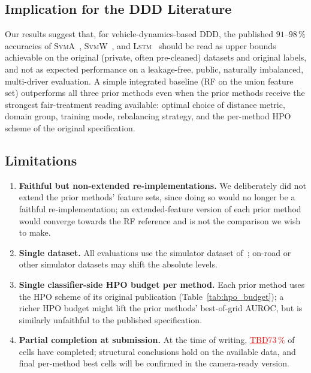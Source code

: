 \documentclass[lettersize,journal]{IEEEtran}
\newcommand{\Impl}[1]{\textsc{#1}}
\newcommand{\TBD}[1]{\textcolor{red}{\underline{TBD#1}}}
\begin{document}
\subsection{Implication for the DDD Literature}
Our results suggest that, for vehicle-dynamics-based DDD, the published $91$--$98\,\%$ accuracies of \Impl{SvmA}~\cite{arefnezhad2019}, \Impl{SvmW}~\cite{zhao2009}, and \Impl{Lstm}~\cite{wang2022} should be read as upper bounds achievable on the original (private, often pre-cleaned) datasets and original labels, and not as expected performance on a leakage-free, public, naturally imbalanced, multi-driver evaluation.
A simple integrated baseline (\Impl{RF} on the union feature set) outperforms all three prior methods even when the prior methods receive the strongest fair-treatment reading available: optimal choice of distance metric, domain group, training mode, rebalancing strategy, and the per-method HPO scheme of the original specification.

\subsection{Limitations}\label{sec:limitations}
\begin{enumerate}
\item \textbf{Faithful but non-extended re-implementations.}
We deliberately did not extend the prior methods' feature sets, since doing so would no longer be a faithful re-implementation; an extended-feature version of each prior method would converge towards the \Impl{RF} reference and is not the comparison we wish to make.
\item \textbf{Single dataset.}
All evaluations use the simulator dataset of~\cite{aygun2024}; on-road or other simulator datasets may shift the absolute levels.
\item \textbf{Single classifier-side HPO budget per method.}
Each prior method uses the HPO scheme of its original publication (Table~\ref{tab:hpo_budget}); a richer HPO budget might lift the prior methods' best-of-grid AUROC, but is similarly unfaithful to the published specification.
\item \textbf{Partial completion at submission.}
At the time of writing, \TBD{$73\,\%$} of cells have completed; structural conclusions hold on the available data, and final per-method best cells will be confirmed in the camera-ready version.
\end{enumerate}

\end{document}
